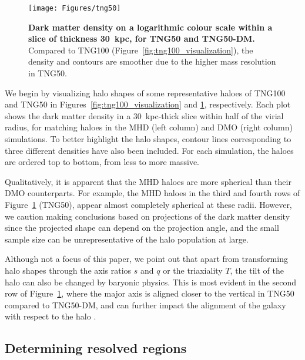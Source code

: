 \documentclass[fleqn,usenatbib]{mnras}
\begin{document}
\begin{figure}
    \centering
    \texttt{[image: Figures/tng50]}
    \caption{{\bf Dark matter density on a logarithmic colour scale within a slice of thickness 30~kpc, for TNG50 and TNG50-DM.}
    Compared to TNG100 (Figure~\ref{fig:tng100_visualization}), the density and contours are smoother due to the higher mass resolution in TNG50. 
    }
    \label{fig:tng50_visualization}
\end{figure}

We begin by visualizing halo shapes of some representative haloes of TNG100 and TNG50 in Figures~\ref{fig:tng100_visualization} and \ref{fig:tng50_visualization}, respectively.
Each plot shows the dark matter density in a 30~kpc-thick slice within half of the virial radius, for matching haloes in the MHD (left column) and DMO (right column) simulations.
To better highlight the halo shapes, contour lines corresponding to three different densities have also been included.
For each simulation, the haloes are ordered top to bottom, from less to more massive.

Qualitatively, it is apparent that the MHD haloes are more spherical than their DMO counterparts.
For example, the MHD haloes in the third and fourth rows of Figure~\ref{fig:tng50_visualization} (TNG50), appear almost completely spherical at these radii.
However, we caution making conclusions based on projections of the dark matter density since the projected shape can depend on the projection angle, and the small sample size can be unrepresentative of the halo population at large.

Although not a focus of this paper, we point out that apart from transforming halo shapes through the axis ratios $s$ and $q$ or the triaxiality $T$, the tilt of the halo can also be changed by baryonic physics.
This is most evident in the second row of Figure~\ref{fig:tng50_visualization}, where the major axis is aligned closer to the vertical in TNG50 compared to TNG50-DM, and can further impact the alignment of the galaxy with respect to the halo \cite[e.g.][]{Tenneti15v453, Velliscig15v454}.

\subsection{Determining resolved regions}
\end{document}
